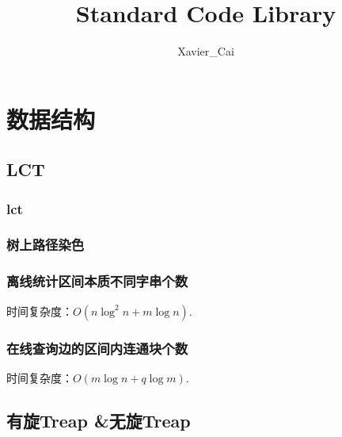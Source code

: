 \documentclass[landscape,twocolumn,a4paper]{article}
\title{\CJKfamily{hei} \bfseries Standard Code Library}
\author{Xavier\_Cai}
\begin{document}
\small
\begin{titlepage}
\maketitle
\end{titlepage}

\newpage
\pagestyle{empty}
\renewcommand{\contentsname}{目录}
\tableofcontents
\newpage\clearpage
\newpage
\pagestyle{fancy}
\setcounter{page}{1}   %
%
\section{数据结构}

\subsection{LCT}
\subsubsection{lct}

\subsubsection{树上路径染色}

\subsubsection{离线统计区间本质不同字串个数}
时间复杂度：$O(n \log^{2}n + m \log n)$.

\subsubsection{在线查询边的区间内连通块个数}
时间复杂度：$O(m \log n + q \log m)$.


\subsection{有旋Treap \&无旋Treap}
\end{document}
